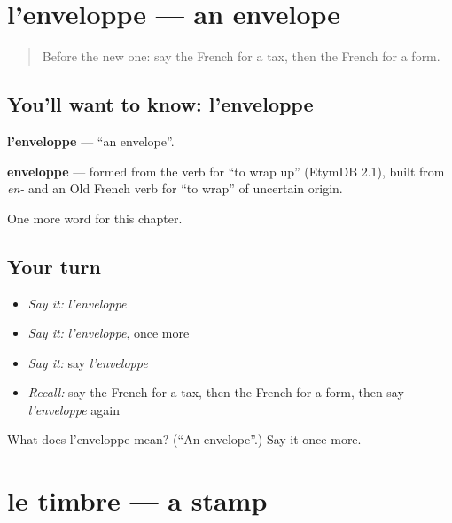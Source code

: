 \section[l'enveloppe]{l'enveloppe — an envelope}

\label{lesson:FR-C252-enveloppe}



\begin{quote}
Before the new one: say the French for a tax, then the French for a form.
\end{quote}

\subsection*{You'll want to know: l'enveloppe}
\textbf{l'enveloppe} — \textquotedblleft{}an envelope\textquotedblright{}.

\begin{cousinweb}
\textbf{enveloppe} — formed from the verb for \textquotedblleft{}to wrap up\textquotedblright{} (EtymDB 2.1), built from \emph{en-} and an Old French verb for \textquotedblleft{}to wrap\textquotedblright{} of uncertain origin.
\end{cousinweb}

\begin{grammarlens}[title={What you've built}]
One more word for this chapter.
\end{grammarlens}

\subsection*{Your turn}
\begin{itemize}
\raggedright
  \item \emph{Say it:} \emph{l'enveloppe}
  \item \emph{Say it:} \emph{l'enveloppe}, once more
  \item \emph{Say it:} say \emph{l'enveloppe}
  \item \emph{Recall:} say the French for a tax, then the French for a form, then say \emph{l'enveloppe} again
\end{itemize}

\begin{tcolorbox}[breakable,colback=teal!4,colframe=teal!35!black,title={Before you move on}]
What does l'enveloppe mean? (\textquotedblleft{}An envelope\textquotedblright{}.) Say it once more.
\end{tcolorbox}
\section[le timbre]{le timbre — a stamp}

